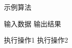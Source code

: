 \documentclass{article}
\begin{document}
\begin{algorithm}
    \caption{示例算法}
    \begin{algorithmic}[1] %
        \Require 输入数据
        \Ensure 输出结果
        
            \State 执行操作1
            \State 执行操作2
        \EndWhile
    \end{algorithmic}
\end{algorithm}
\end{document}
